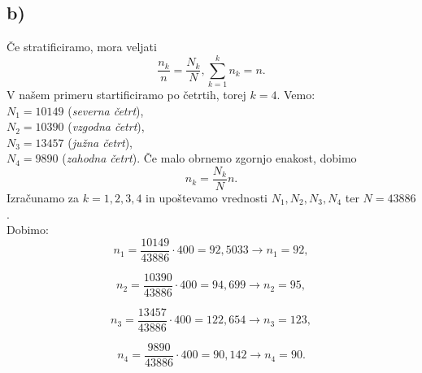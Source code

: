 \documentclass{article}
\begin{document}
\subsection*{b)}

Če stratificiramo, mora veljati 
\begin{equation*}
\frac{n_k}{n} = \frac{N_k}{N},   \sum_{k=1}^k n_k = n .
\end{equation*}
V našem primeru startificiramo po četrtih, torej $k=4$.
Vemo:\\
$N_1 = 10 149$ (\textit{severna četrt}),\\
$N_2 = 10 390$ (\textit{vzgodna četrt}),\\
$N_3 = 13 457$ (\textit{južna četrt}),\\
$N_4 = 9 890$ (\textit{zahodna četrt}).
Če malo obrnemo zgornjo enakost, dobimo
\begin{equation*}
n_k = \frac{N_k}{N} n.
\end{equation*}
Izračunamo za $k = 1,2,3,4$ in upoštevamo vrednosti $N_1,N_2,N_3,N_4$ ter $N = 43886$.\\
Dobimo:
\begin{equation*}
n_1 = \frac{10149}{43886} \cdot 400 = 92,5033 \rightarrow n_1 = 92,
\end{equation*}

\begin{equation*}
n_2 = \frac{10390}{43886} \cdot 400 = 94, 699 \rightarrow n_2 = 95,
\end{equation*}

\begin{equation*}
n_3 = \frac{13457}{43886} \cdot 400 = 122,654 \rightarrow n_3 = 123,
\end{equation*}

\begin{equation*}
n_4 = \frac{9890}{43886} \cdot 400 = 90,142 \rightarrow n_4 = 90.
\end{equation*}
\end{document}
